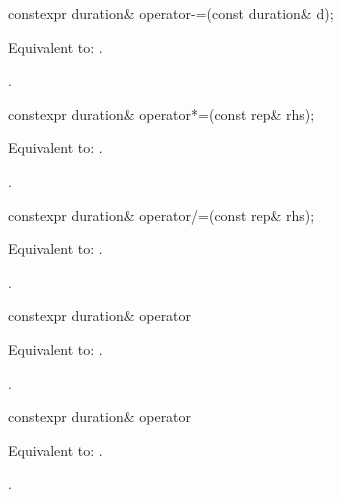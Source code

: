 %
\begin{itemdecl}
constexpr duration& operator-=(const duration& d);
\end{itemdecl}

\begin{itemdescr}
\pnum
\effects
Equivalent to: .

\pnum
\returns
{}.
\end{itemdescr}

%
\begin{itemdecl}
constexpr duration& operator*=(const rep& rhs);
\end{itemdecl}

\begin{itemdescr}
\pnum
\effects
Equivalent to: .

\pnum
\returns
{}.
\end{itemdescr}

%
\begin{itemdecl}
constexpr duration& operator/=(const rep& rhs);
\end{itemdecl}

\begin{itemdescr}
\pnum
\effects
Equivalent to: .

\pnum
\returns
{}.
\end{itemdescr}

%
\begin{itemdecl}
constexpr duration& operator%
\end{itemdecl}

\begin{itemdescr}
\pnum
\effects
Equivalent to: .

\pnum
\returns
{}.
\end{itemdescr}

%
\begin{itemdecl}
constexpr duration& operator%
\end{itemdecl}

\begin{itemdescr}
\pnum
\effects
Equivalent to: .

\pnum
\returns
{}.
\end{itemdescr}


